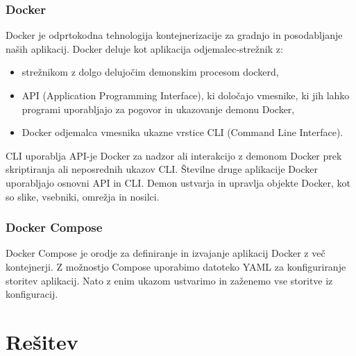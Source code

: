 \documentclass[a4paper,12pt,openright]{book}
\begin{document}
\subsection{Docker}
Docker\cite{dockerLink} je odprtokodna tehnologija kontejnerizacije za gradnjo in posodabljanje naših aplikacij.
Docker deluje kot aplikacija odjemalec-strežnik z:
\begin{itemize}
    \item strežnikom z dolgo delujočim demonskim procesom dockerd,
    \item API (Application Programming Interface), ki določajo vmesnike, ki jih lahko programi uporabljajo za pogovor in ukazovanje demonu Docker,
    \item Docker odjemalca vmesnika ukazne vrstice CLI (Command Line Interface).
\end{itemize}
CLI uporablja API-je Docker za nadzor ali interakcijo z demonom Docker prek skriptiranja ali neposrednih ukazov CLI. Številne druge aplikacije Docker uporabljajo osnovni API in CLI. Demon ustvarja in upravlja objekte Docker, kot so slike, vsebniki, omrežja in nosilci.

\subsection{Docker Compose}
\label{Docker}
Docker Compose\cite{dockerComposeLink} je orodje za definiranje in izvajanje aplikacij Docker z več kontejnerji. Z možnostjo Compose uporabimo datoteko YAML za konfiguriranje storitev aplikacij. Nato z enim ukazom ustvarimo in zaženemo vse storitve iz konfiguracij.
\chapter{Rešitev}
\end{document}
